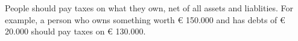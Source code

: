 People should pay taxes on what they own, net of all assets and liablities.
For example, a person who owns something worth € 150.000 and has debts of € 20.000 should pay taxes on € 130.000.